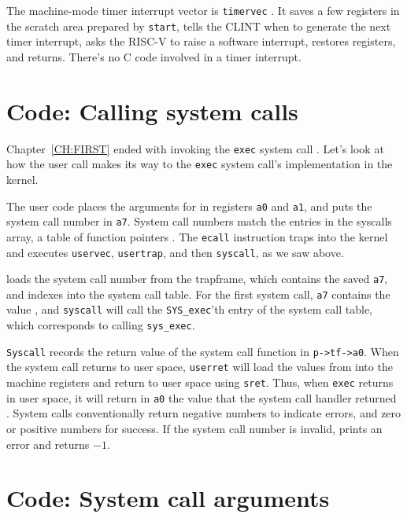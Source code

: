The machine-mode timer interrupt vector is {\tt timervec} 
.
It saves a few registers in the scratch area prepared by {\tt start},
tells the CLINT when to generate the next timer interrupt,
asks the RISC-V to raise a software interrupt,
restores registers, and returns.
There's no C code involved in a timer interrupt.

\section{Code: Calling system calls}

Chapter~\ref{CH:FIRST} ended with 
invoking the {\tt exec} system call
.
Let's look at how the user call
makes its way to the {\tt exec} system call's
implementation in the kernel.

The user code places the arguments for
in registers {\tt a0} and {\tt a1}, and puts the
system call number in
\texttt{a7}.
System call numbers match the entries in the syscalls array,
a table of function pointers
.
The \lstinline{ecall} instruction traps into the kernel
and executes {\tt uservec},
{\tt usertrap}, and then {\tt syscall}, as we saw above.

loads the system call number from the trapframe, which
contains the saved
\texttt{a7},
and indexes into the system call table.
For the first system call, 
\texttt{a7}
contains the value 
,
and
\lstinline{syscall}
will call the 
\lstinline{SYS_exec}'th 
entry of the system call table, which corresponds to calling
\lstinline{sys_exec}.

\lstinline{Syscall}
records the return value of the system call function in
\lstinline{p->tf->a0}.
When the system call returns to user space,
\lstinline{userret}
will load the values from
into the machine registers
and return to user space
using
\lstinline{sret}.
Thus, when 
\lstinline{exec}
returns in user space, it will return in \lstinline{a0} the value
that the system call handler returned
.
System calls conventionally return negative numbers to indicate
errors, and zero or positive numbers for success.
If the system call number is invalid,
prints an error and returns $-1$.

\section{Code: System call arguments}

